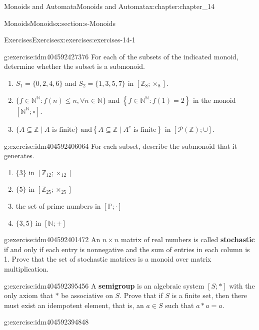 \documentclass[twoside,10pt,]{book}
\newcommand{\terminology}[1]{\textbf{#1}}
\numberwithin{equation}{section}
\begin{document}
\begin{chapterptx}{Monoids and Automata}{}{Monoids and Automata}{}{}{x:chapter:chapter_14}
\begin{sectionptx}{Monoids}{}{Monoids}{}{}{x:section:s-Monoids}
\begin{exercises-subsection}{Exercises}{}{Exercises}{}{}{x:exercises:exercises-14-1}
\begin{divisionexercise}{1}{}{}{g:exercise:idm404592427376}%
For each of the subsets of the indicated monoid, determine whether the subset is a submonoid.%
\begin{enumerate}[label=(\alph*)]
\item{}\(S_1=\{0,2,4,6\}\) and  \(S_2=\{1,3,5,7\}\) in \([\mathbb{Z}_8;\times_8].\)%
\item{}\(\{f\in \mathbb{N}^{\mathbb{N}}:f(n) \leqslant n, \forall n \in \mathbb{N}\}\) and  \(\left\{f\in \mathbb{N}^{\mathbb{N}}:f(1)=2\right\}\) in the monoid \([\mathbb{N}^{\mathbb{N}};\circ]\).%
\item{}\(\{A\subseteq \mathbb{Z} \mid A \textrm{ is finite}\} \textrm{ and} \left\{A\subseteq \mathbb{Z} \mid A^c\textrm{ is} \textrm{ finite}\right\}\) in \([\mathcal{P}(\mathbb{Z});\cup].\)%
\end{enumerate}
%
\end{divisionexercise}%
\begin{divisionexercise}{2}{}{}{g:exercise:idm404592406064}%
For each subset, describe the submonoid that it generates.%
\begin{enumerate}[label=(\alph*)]
\item{}\(\{3\}\) in \([\mathbb{Z}_{12};\times_{12}]\)%
\item{}\(\{5\} \textrm{ in } [\mathbb{Z}_{25};\times_{25}]\)%
\item{}the set of prime numbers in \([\mathbb{P}; \cdot ]\)%
\item{}\(\{3,5\} \textrm{ in } [\mathbb{N}; +]\)%
\end{enumerate}
%
\end{divisionexercise}%
\begin{divisionexercise}{3}{}{}{g:exercise:idm404592401472}%
An \(n \times n\)  matrix of real numbers is called \terminology{stochastic} if and only if each entry is nonnegative and the sum of entries in each column is 1. Prove that the set of stochastic matrices is a monoid over matrix multiplication.%
\end{divisionexercise}%
\begin{divisionexercise}{4}{}{}{g:exercise:idm404592395456}%
A \terminology{semigroup} is an algebraic system \([S; *]\) with the only axiom that \(*\) be associative on \(S\). Prove that if \(S\) is a finite set, then there must exist an idempotent element, that is, an \(a \in  S\) such that \(a * a = a\).%
\end{divisionexercise}%
\begin{divisionexercise}{5}{}{}{g:exercise:idm404592394848}%

\end{divisionexercise}
\end{exercises-subsection}
\end{sectionptx}
\end{chapterptx}
\end{document}

